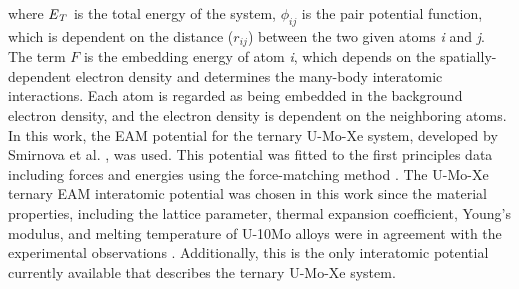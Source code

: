 \documentclass[preprint,12pt]{elsarticle}
\begin{document}
\noindent where $\it{E}_{T}$ is the total energy of the system, $\phi_{ij}$ is the pair potential function, which is dependent on the distance ($r_{ij}$) between the two given atoms \textit{i} and \textit{j}. The term $F$ is the embedding energy of {atom \textit{i}}, which depends on the spatially-dependent electron density and determines the many-body interatomic interactions. Each atom is regarded as being embedded in the background electron density, and the electron density is dependent on the neighboring atoms. In this work, the EAM potential for the ternary U-Mo-Xe system, developed by Smirnova et al. \cite{smirnova2013ternary}, was used. This potential was fitted to the first principles data including forces and energies using the force-matching method \cite{ercolessi1994interatomic}. The U-Mo-Xe ternary EAM interatomic potential was chosen in this work since the material properties, including the lattice parameter, thermal expansion coefficient, Young's modulus, and melting temperature of U-10Mo alloys were in agreement with the experimental observations \cite{smirnova2013ternary}. Additionally, this is the only interatomic potential currently available that describes the ternary U-Mo-Xe system.
\end{document}
